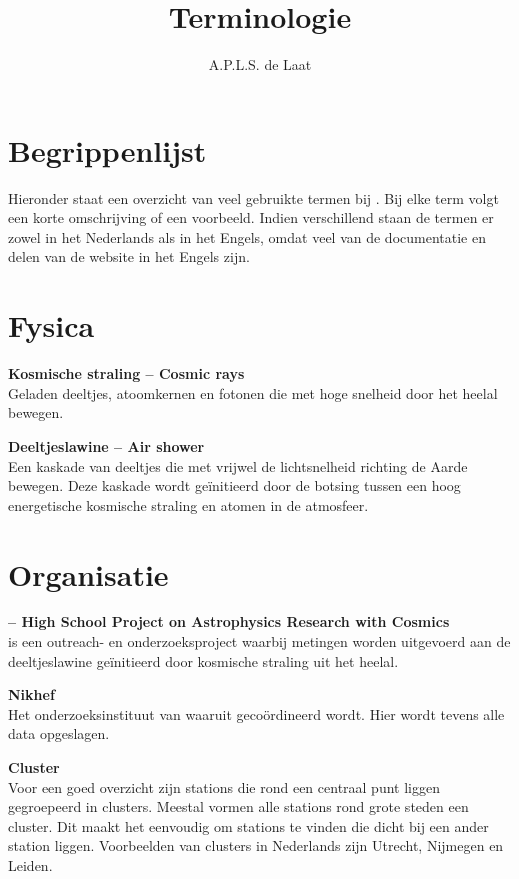 

\title{Terminologie}
\author{A.P.L.S. de Laat}



\maketitle

\section{Begrippenlijst}

Hieronder staat een overzicht van veel gebruikte termen bij \hisparc. Bij elke term volgt een
korte omschrijving of een voorbeeld. Indien verschillend staan de termen er
zowel in het Nederlands als in het Engels, omdat veel van de documentatie en
delen van de website in het Engels zijn.


\section{Fysica}

\textbf{Kosmische straling -- Cosmic rays} \\
Geladen deeltjes, atoomkernen en fotonen die met hoge snelheid door
het heelal bewegen.

\textbf{Deeltjeslawine -- Air shower} \\
Een kaskade van deeltjes die met vrijwel de lichtsnelheid richting de
Aarde bewegen. Deze kaskade wordt geïnitieerd door de botsing tussen een
hoog energetische kosmische straling en atomen in de atmosfeer.


\section{Organisatie}

\textbf{\hisparc -- High School Project on Astrophysics Research with Cosmics} \\
\hisparc is een outreach- en onderzoeksproject waarbij metingen worden
uitgevoerd aan de deeltjeslawine geïnitieerd door kosmische straling uit
het heelal.

\textbf{Nikhef} \\
Het onderzoeksinstituut van waaruit \hisparc gecoördineerd wordt. Hier wordt tevens alle data opgeslagen.

\textbf{Cluster} \\
Voor een goed overzicht zijn stations die rond een centraal punt liggen gegroepeerd in clusters. Meestal vormen alle stations
rond grote steden een cluster. Dit maakt het eenvoudig om stations te
vinden die dicht bij een ander station liggen. Voorbeelden van clusters
in Nederlands zijn Utrecht, Nijmegen en Leiden.

